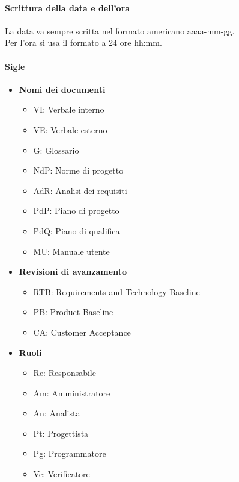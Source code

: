 \paragraph{Scrittura della data e dell'ora}
La data va sempre scritta nel formato americano aaaa-mm-gg. \\
Per l'ora si usa il formato a 24 ore hh:mm.

\paragraph{Sigle}
\begin{itemize}
        \item \textbf{Nomi dei documenti}
                \begin{itemize}
                        \item VI: Verbale interno
                        \item VE: Verbale esterno
                        \item G: Glossario
                        \item NdP: Norme di progetto
                        \item AdR: Analisi dei requisiti
                        \item PdP: Piano di progetto
                        \item PdQ: Piano di qualifica
                        \item MU: Manuale utente
                \end{itemize}
        \item \textbf{Revisioni di avanzamento}
                \begin{itemize}
                        \item RTB: Requirements and Technology Baseline
                        \item PB: Product Baseline
                        \item CA: Customer Acceptance
                \end{itemize}
        \item \textbf{Ruoli}
                \begin{itemize}
                        \item Re: Responsabile
                        \item Am: Amministratore
                        \item An: Analista
                        \item Pt: Progettista
                        \item Pg: Programmatore
                        \item Ve: Verificatore
                \end{itemize}
\end{itemize}
